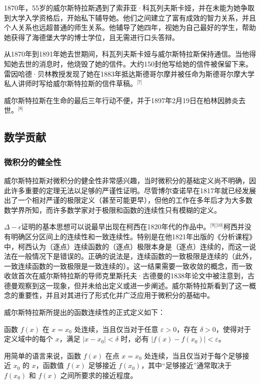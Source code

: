 1870年，55岁的威尔斯特拉斯遇到了索菲亚·科瓦列夫斯卡娅，并在未能为她争取到大学入学资格后，开始私下辅导她。他们之间建立了富有成效的智力关系，并且个人关系也远超普通的师生关系。他辅导了她四年，视她为自己最好的学生，帮助她获得了海德堡大学的博士学位，且无需进行口头答辩。

从1870年到1891年她去世期间，科瓦列夫斯卡娅与威尔斯特拉斯保持通信。当他得知她去世的消息时，他烧毁了她的信件。大约150封他写给她的信件被保留下来。雷因哈德·贝林教授发现了她在1883年抵达斯德哥尔摩并被任命为斯德哥尔摩大学私人讲师时写给威尔斯特拉斯的信件草稿。\(^\text{[7]}\)

威尔斯特拉斯在生命的最后三年行动不便，并于1897年2月19日在柏林因肺炎去世。\(^\text{[8]}\)
\subsection{数学贡献}
\subsubsection{微积分的健全性}  
威尔斯特拉斯对微积分的健全性非常感兴趣，当时微积分的基础定义尚不明确，因此许多重要的定理无法以足够的严谨性证明。尽管博尔查诺早在1817年就已经发展出了一个相对严谨的极限定义（甚至可能更早），但他的工作在多年后才为大多数数学界所知，而许多数学家对于极限和函数的连续性只有模糊的定义。

\(\Delta-\epsilon\)证明的基本思想可以说最早出现在柯西在1820年代的作品中。\(^\text{[9][10]}\)柯西并没有明确区分区间上的连续性和一致连续性。特别是在他1821年出版的《分析课程》中，柯西认为（逐点）连续函数的（逐点）极限本身是（逐点）连续的，而这一说法在一般情况下是错误的。正确的说法是，连续函数的一致极限是连续的（此外，一致连续函数的一致极限是一致连续的）。这一结果需要一致收敛的概念，而一致收敛首次在威尔斯特拉斯的导师克里斯托夫·古德曼的1838年论文中被注意到，古德曼观察到这一现象，但并未给出定义或进一步阐述。威尔斯特拉斯看到了这一概念的重要性，并且对其进行了形式化并广泛应用于微积分的基础中。

威尔斯特拉斯所提出的函数连续性的正式定义如下：

函数 \( f(x) \) 在 \( x = x_0 \) 处连续，当且仅当对于任意 \( \varepsilon > 0 \)，存在 \( \delta > 0 \)，使得对于定义域中的每个 \( x \)，满足 \( |x - x_0| < \delta \) 时，必有 \( |f(x) - f(x_0)| < \varepsilon \)。

用简单的语言来说，函数 \( f(x) \) 在点 \( x = x_0 \) 处连续，当且仅当对于每个足够接近 \( x_0 \) 的 \( x \)，函数值 \( f(x) \) 足够接近 \( f(x_0) \)，其中“足够接近”通常取决于 \( f(x_0) \) 和 \( f(x) \) 之间所要求的接近程度。

